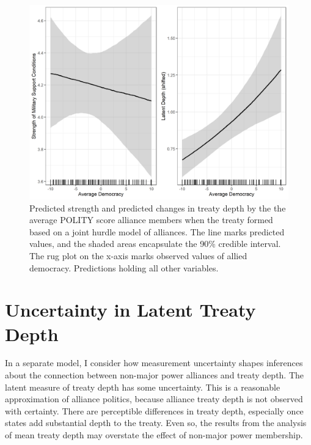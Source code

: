 \documentclass[12pt]{article}
\begin{document}
\begin{figure}
\includegraphics[width=.95\textwidth]{results-joint-hurdle.png}  
\caption{Predicted strength and predicted changes in treaty depth by the the average POLITY score alliance members when the treaty formed based on a joint hurdle model of alliances. The line marks predicted values, and the shaded areas encapsulate the 90\% credible interval. The rug plot on the x-axis marks observed values of allied democracy. Predictions holding all other variables.}
\label{fig:results-joint-hurdle}
\end{figure}



\section{Uncertainty in Latent Treaty Depth} 


In a separate model, I consider how measurement uncertainty shapes inferences about the connection between non-major power alliances and treaty depth. 
The latent measure of treaty depth has some uncertainty. 
This is a reasonable approximation of alliance politics, because alliance treaty depth is not observed with certainty. 
There are perceptible differences in treaty depth, especially once states add substantial depth to the treaty. 
Even so, the results from the analysis of mean treaty depth may overstate the effect of non-major power membership. 
\end{document}
